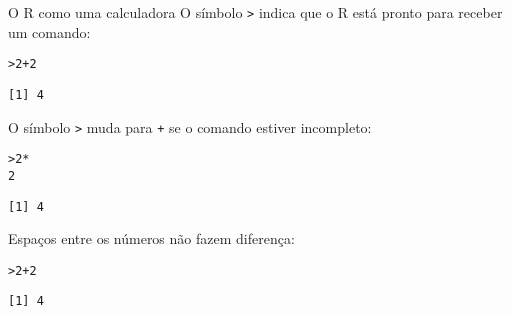 \documentclass[10pt,handout]{beamer}\usepackage{graphicx, color}
\makeatletter
\newenvironment{kframe}{%
 \def\at@end@of@kframe{}%
 \ifinner\ifhmode%
  \def\at@end@of@kframe{\end{minipage}}%
  \begin{minipage}{\columnwidth}%
 \fi\fi%
 \def\FrameCommand##1{\hskip\@totalleftmargin \hskip-\fboxsep
 \colorbox{shadecolor}{##1}\hskip-\fboxsep
     \hskip-\linewidth \hskip-\@totalleftmargin \hskip\columnwidth}%
 \MakeFramed {\advance\hsize-\width
   \@totalleftmargin\z@ \linewidth\hsize
   \@setminipage}}%
 {\par\unskip\endMakeFramed%
 \at@end@of@kframe}
\newenvironment{knitrout}{}{} %
\makeatother
\begin{document}
\begin{frame}[fragile=singleslide]{O R como uma calculadora}
O símbolo \verb|>| indica que o R está pronto para receber um comando:
\begin{knitrout}\small
{}\color{fgcolor}\begin{kframe}
\begin{alltt}
> 2 + 2
\end{alltt}
\begin{verbatim}
[1] 4
\end{verbatim}
\end{kframe}
\end{knitrout}

O símbolo \verb|>| muda para \verb|+| se o comando estiver incompleto:
\begin{knitrout}\small
{}\color{fgcolor}\begin{kframe}
\begin{alltt}
> 2 *
  2
\end{alltt}
\begin{verbatim}
[1] 4
\end{verbatim}
\end{kframe}
\end{knitrout}

Espaços entre os números não fazem diferença:
\begin{knitrout}\small
{}\color{fgcolor}\begin{kframe}
\begin{alltt}
> 2+         2
\end{alltt}
\begin{verbatim}
[1] 4
\end{verbatim}
\end{kframe}
\end{knitrout}

\end{frame}
\end{document}
